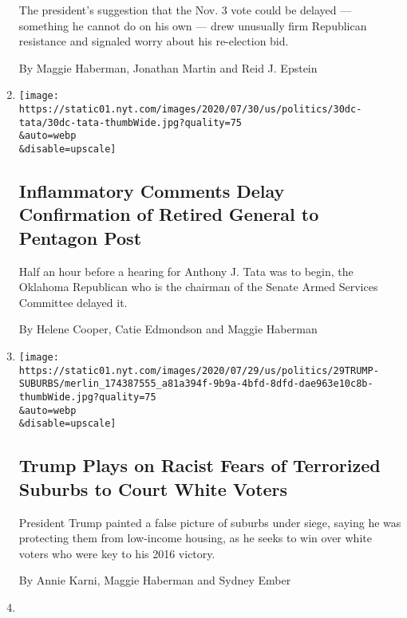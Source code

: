 \begin{enumerate}
  The president's suggestion that the Nov. 3 vote could be delayed ---
  something he cannot do on his own --- drew unusually firm Republican
  resistance and signaled worry about his re-election bid.

  By Maggie Haberman, Jonathan Martin and Reid J. Epstein
\item
  \href{/2020/07/30/us/politics/trump-inhofe-tata-pentagon.html}{}

  \texttt{[image: https://static01.nyt.com/images/2020/07/30/us/politics/30dc-tata/30dc-tata-thumbWide.jpg?quality=75\\\&auto=webp\\\&disable=upscale]}

  \hypertarget{inflammatory-comments-delay-confirmation-of-retired-general-to-pentagon-post}{%
  \subsection{Inflammatory Comments Delay Confirmation of Retired
  General to Pentagon
  Post}\label{inflammatory-comments-delay-confirmation-of-retired-general-to-pentagon-post}}

  Half an hour before a hearing for Anthony J. Tata was to begin, the
  Oklahoma Republican who is the chairman of the Senate Armed Services
  Committee delayed it.

  By Helene Cooper, Catie Edmondson and Maggie Haberman
\item
  \href{/2020/07/29/us/politics/trump-suburbs-housing-white-voters.html}{}

  \texttt{[image: https://static01.nyt.com/images/2020/07/29/us/politics/29TRUMP-SUBURBS/merlin\_174387555\_a81a394f-9b9a-4bfd-8dfd-dae963e10c8b-thumbWide.jpg?quality=75\\\&auto=webp\\\&disable=upscale]}

  \hypertarget{trump-plays-on-racist-fears-of-terrorized-suburbs-to-court-white-voters}{%
  \subsection{Trump Plays on Racist Fears of Terrorized Suburbs to Court
  White
  Voters}\label{trump-plays-on-racist-fears-of-terrorized-suburbs-to-court-white-voters}}

  President Trump painted a false picture of suburbs under siege, saying
  he was protecting them from low-income housing, as he seeks to win
  over white voters who were key to his 2016 victory.

  By Annie Karni, Maggie Haberman and Sydney Ember
\item
  \href{/2020/07/29/us/protests-portland-federal-withdrawal.html}{}


\end{enumerate}
